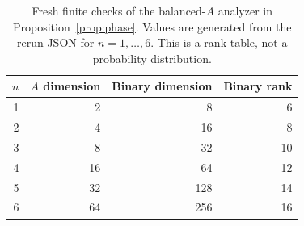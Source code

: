\begin{table}[ht]\centering
\begin{tabular}{rrrr}\toprule
$n$ & $A$ dimension & Binary dimension & Binary rank\\\midrule
1 & 2 & 8 & 6\\
2 & 4 & 16 & 8\\
3 & 8 & 32 & 10\\
4 & 16 & 64 & 12\\
5 & 32 & 128 & 14\\
6 & 64 & 256 & 16\\
\bottomrule\end{tabular}
\caption{Fresh finite checks of the balanced-$A$ analyzer in Proposition~\ref{prop:phase}. Values are generated from the rerun JSON for $n=1,\ldots,6$. This is a rank table, not a probability distribution.}\label{tab:phase}
\end{table}
